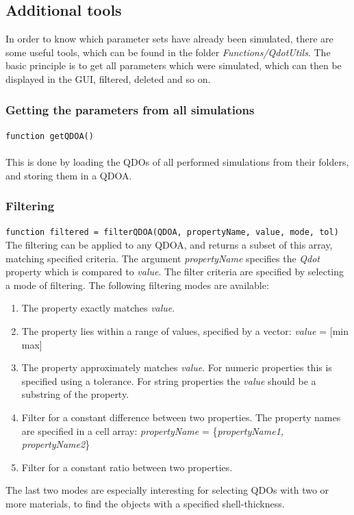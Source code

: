 				
		\subsection{Additional tools} \label{sec:addTools}
			In order to know which parameter sets have already been simulated, there are some useful tools, which can be found in the folder \textit{Functions/QdotUtils}. The basic principle is to get all parameters which were simulated, which can then be displayed in the GUI, filtered, deleted and so on.
			
			\subsubsection{Getting the parameters from all simulations}
				\lstinline{function getQDOA()}\\\\
				This is done by loading the QDOs of all performed simulations from their folders, and storing them in a QDOA.

			\subsubsection{Filtering}
			\lstinline{function filtered = filterQDOA(QDOA, propertyName, value, mode, tol)}\\
			
			The filtering can be applied to any QDOA, and returns a subset of this array, matching specified criteria. The argument \textit{propertyName} specifies the \textit{Qdot} property which is compared to \textit{value}. The filter criteria are specified by selecting a mode of filtering. The following filtering modes are available:
			
			\begin{enumerate}
				\item The property exactly matches \textit{value}.
				\item The property lies within a range of values, specified by a vector: \textit{value} = [min max]
				\item The property approximately matches \textit{value}. For numeric properties this is specified using a tolerance. For string properties the \textit{value} should be a substring of the property.
				\item Filter for a constant difference between two properties. The property names are specified in a cell array: \textit{propertyName} = \{\textit{propertyName1, propertyName2}\}
				\item Filter for a constant ratio between two properties.
			\end{enumerate}
			The last two modes are especially interesting for selecting QDOs with two or more materials, to find the objects with a specified shell-thickness.\\
			
